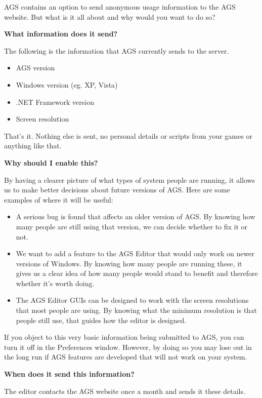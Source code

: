 AGS contains an option to send anonymous usage information to the AGS website.
But what is it all about and why would you want to do so?

\bf{What information does it send?}

The following is the information that AGS currently sends to the server.

\begin{itemize}\itemsep=0pt
\item AGS version
\item Windows version (eg. XP, Vista)
\item .NET Framework version
\item Screen resolution
\end{itemize}

That's it. Nothing else is sent, no personal details or scripts from your games
or anything like that.

\bf{Why should I enable this?}

By having a clearer picture of what types of system people are running, it
allows us to make better decisions about future versions of AGS. Here are some
examples of where it will be useful:

\begin{itemize}
\item A serious bug is found that affects an older version of AGS. By knowing how
many people are still using that version, we can decide whether to fix it or not.
\item We want to add a feature to the AGS Editor that would only work on newer versions of Windows. By
knowing how many people are running these, it gives us a clear idea of how many
people would stand to benefit and therefore whether it's worth doing.
\item The AGS Editor GUIs can be designed to work with the screen resolutions
that most people are using. By knowing what the minimum resolution is that people
still use, that guides how the editor is designed.
\end{itemize}

If you object to this very basic information being submitted to AGS, you can
turn it off in the Preferences window. However, by doing so you may lose out in
the long run if AGS features are developed that will not work on your system.

\bf{When does it send this information?}

The editor contacts the AGS website once a month and sends it these details.

